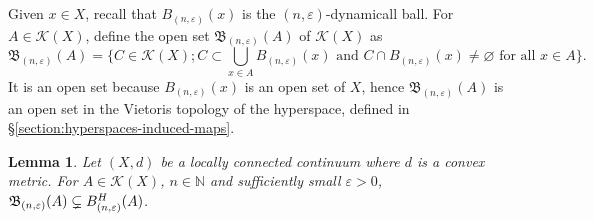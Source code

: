 \documentclass[sn-mathphys-num]{sn-jnl}%
\theoremstyle{thmstyleone}%
\newtheorem{lemma}{Lemma}
\theoremstyle{thmstyletwo}%
\theoremstyle{thmstylethree}%
\newcommand*\hyp[1]{\mathcal{#1}}
\begin{document}
Given $x \in X$, recall that $B_{(n, \varepsilon)}(x)$ is the $(n, \varepsilon)$-dynamicall ball. For $A \in \hyp{K}(X)$, define the open set $\mathfrak{B}_{(n, \varepsilon)}(A)$ of $\hyp{K}(X)$ as
\begin{equation*}
    \mathfrak{B}_{(n, \varepsilon)}(A) = \{C \in \hyp{K}(X); C \subset \bigcup\limits_{x \in A} B_{(n, \varepsilon)}(x) \text{ and } C \cap B_{(n, \varepsilon)}(x) \neq \varnothing \text{ for all } x \in A\}.
\end{equation*}
It is an open set because $B_{(n, \varepsilon)}(x)$ is an open set of $X$, hence $\mathfrak{B}_{(n, \varepsilon)}(A)$ is an open set in the Vietoris topology of the hyperspace, defined in \S\ref{section:hyperspaces-induced-maps}.\\

\begin{lemma}\label{lemma:dynamical-balls-hyperspace-subset}
    Let $(X, d)$ be a locally connected continuum where $d$ is a convex metric. For $A \in \hyp{K}(X)$, $n \in \mathbb{N}$ and sufficiently small $\varepsilon > 0$, $\mathfrak{B}_{(n, \varepsilon)}(A) \subsetneq \emph{\textbf{B}}^H_{(n, \varepsilon)}(A)$.
\end{lemma}
\end{document}
